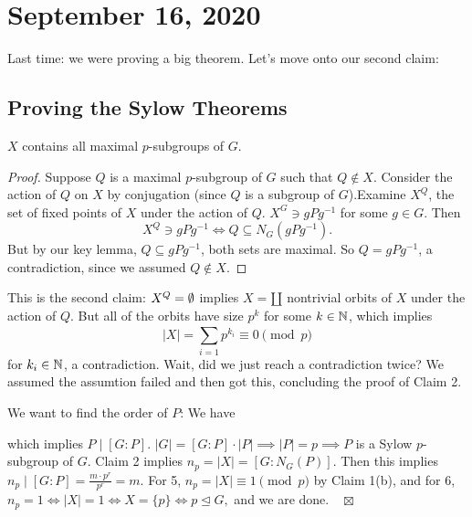 \section{September 16, 2020}
Last time: we were proving a big theorem. Let's move onto our second claim:
\subsection{Proving the Sylow Theorems}
\begin{claim}
    $X$ contains all maximal $p$-subgroups of $G$.
\end{claim}
\begin{proof}
    Suppose $Q$ is a maximal $p$-subgroup of $G$ such that $Q\notin X$. Consider the action of $Q$ on $X$ by conjugation (since $Q$ is a subgroup of $G$).Examine $X^{Q}$, the set of fixed points of $X$ under the action of $Q$. $X^G\ni gPg^{-1}$ for some $g\in G$. Then \[
        X^Q \ni gPg^{-1} \iff Q\subseteq N_G(gPg^{-1}).
    \] But by our key lemma, $Q\subseteq gPg^{-1}$, both sets are maximal. So $Q=gPg^{-1}$, a contradiction, since we assumed $Q\notin X$.
\end{proof}
\begin{claim}
    This is the second claim: $X^Q=\emptyset$ implies $X=\amalg$ nontrivial orbits of $X$ under the action of $Q$. But all of the orbits have size $p^k$ for some $k\in \mathbb{N}$, which implies \[
    |X|=\sum_{i=1}^{} p^{k_i}\equiv 0 \pmod p
    \] for $k_i\in \mathbb{N}$, a contradiction. Wait, did we just reach a contradiction twice? We assumed the assumtion failed and then got this, concluding the proof of Claim 2.
\end{claim}
We want to find the order of $P$: We have 
            \begin{figure}[H]
                \centering
            \end{figure}
            which implies  $P \mid [G:P]$. $|G|=[G:P]\cdot |P|  \implies |P|=p\implies P$ is a Sylow $p$-subgroup of $G$. Claim 2 implies $n_p=|X|=[G:N_G(P)]$. Then this implies $n_p  \mid [G:P]=\frac{m\cdot p^{r}}{p^{r}}=m$. For 5, $n_p=|X|\equiv 1 \pmod p$ by Claim 1(b), and for 6, $n_p=1\iff |X|=1\iff X=\{p\} \iff p \trianglelefteq G,$ and we are done.$\quad\boxtimes$

